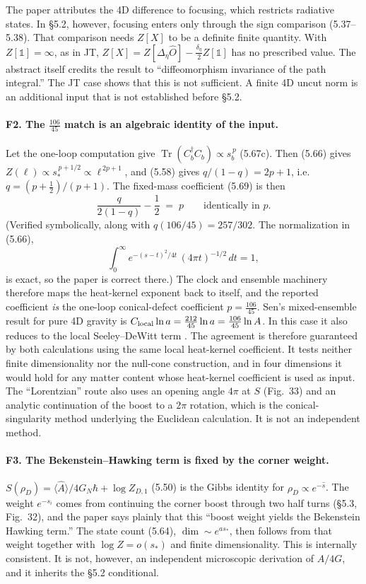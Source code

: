 \documentclass[11pt]{article}
\theoremstyle{remark}
\newcommand{\Tr}{\operatorname{Tr}}
\newcommand{\one}{\mathbb 1}
\begin{document}
The paper attributes the 4D difference to focusing, which restricts radiative states.
In \S5.2, however, focusing enters only through the sign comparison (5.37--5.38). That
comparison needs $Z[X]$ to be a definite finite quantity. With $Z[\one]=\infty$, as in
JT, $Z[X]=Z[\Delta_\eta\hat O]-\tfrac{\delta_\eta}{2}Z[\one]$ has no prescribed value. The
abstract itself credits the result to ``diffeomorphism invariance of the path
integral.'' The JT case shows that this is not sufficient. A finite 4D uncut norm is an
additional input that is not established before \S5.2.

\paragraph{F2. The $\tfrac{106}{45}$ match is an algebraic identity of the input.}
Let the one-loop computation give $\Tr(C_b^\dagger C_b)\propto s_b^{\,p}$ (5.67c). Then
(5.66) gives $Z(\ell)\propto s_*^{\,p+1/2}\propto\ell^{\,2p+1}$, and (5.58) gives
$q/(1-q)=2p+1$, i.e.\ $q=(p+\tfrac12)/(p+1)$. The fixed-mass coefficient (5.69) is then
\[
\frac{q}{2(1-q)}-\frac12 \;=\; p\qquad\text{identically in }p .
\]
(Verified symbolically, along with $q(106/45)=257/302$. The normalization in (5.66),
\[\int_0^\infty e^{-(s-t)^2/4t}\,(4\pi t)^{-1/2}\,dt=1,\]
is exact, so the paper is correct there.) The clock and ensemble machinery therefore maps the heat-kernel exponent back to
itself, and the reported coefficient \emph{is} the one-loop conical-defect coefficient
$p=\tfrac{106}{45}$. Sen's mixed-ensemble result for pure 4D gravity is
$C_{\rm local}\ln a=\tfrac{212}{45}\ln a=\tfrac{106}{45}\ln A$. In this case it also
reduces to the local Seeley--DeWitt term \cite[Eqs.~(1.2), (1.4)]{Sen}. The
agreement is therefore guaranteed by both calculations using the same local heat-kernel
coefficient. It tests neither finite dimensionality nor the null-cone construction,
and in four dimensions it would hold for any matter content whose heat-kernel coefficient is used as input. The ``Lorentzian'' route also uses an
opening angle $4\pi$ at $S$ (Fig.~33) and an analytic continuation of the boost to a
$2\pi$ rotation, which is the conical-singularity method underlying the Euclidean
calculation. It is not an independent method.

\paragraph{F3. The Bekenstein--Hawking term is fixed by the corner weight.}
$S(\rho_D)=\langle\hat A\rangle/4G_N\hbar+\log Z_{D,1}$ (5.50) is the Gibbs identity for
$\rho_D\propto e^{-\hat s}$. The weight $e^{-s_i}$ comes from continuing the corner boost
through two half turns (\S5.3, Fig.~32), and the paper says plainly that this
``boost weight yields the Bekenstein Hawking term.'' The state count (5.64),
$\dim\sim e^{as_*}$, then follows from that weight together with $\log Z=o(s_*)$ and
finite dimensionality. This is internally consistent. It is not, however, an
independent microscopic derivation of $A/4G$, and it inherits the \S5.2 conditional.
\end{document}
